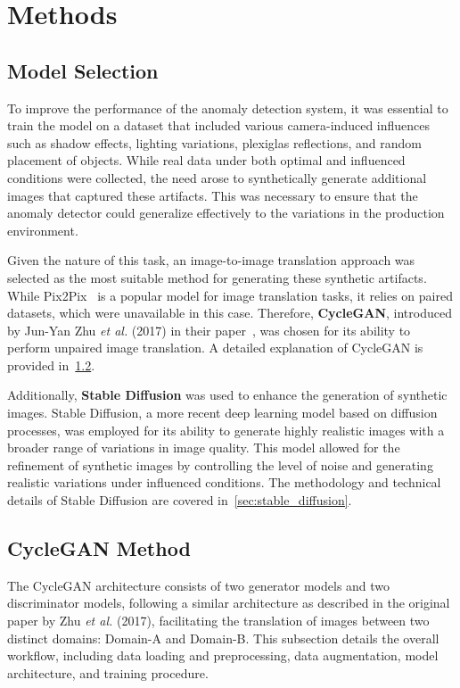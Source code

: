 \documentclass[12pt,DIV14,BCOR12mm,a4paper,footinclude=false,headinclude,parskip=half-,twoside,openright,cleardoublepage=empty,toc=index,bibliography=totoc,listof=totoc]{scrreprt}
\numberwithin{equation}{chapter}
\begin{document}
\section{Methods}
\subsection{Model Selection}
To improve the performance of the anomaly detection system, it was essential to train the model on a dataset that included various camera-induced influences such as shadow effects, lighting variations, plexiglas reflections, and random placement of objects. While real data under both optimal and influenced conditions were collected, the need arose to synthetically generate additional images that captured these artifacts. This was necessary to ensure that the anomaly detector could generalize effectively to the variations in the production environment.

Given the nature of this task, an image-to-image translation approach was selected as the most suitable method for generating these synthetic artifacts. While Pix2Pix~\cite{isola2017image} is a popular model for image translation tasks, it relies on paired datasets, which were unavailable in this case. Therefore, \textbf{CycleGAN}, introduced by Jun-Yan Zhu \textit{et al.} (2017) in their paper~\cite{zhu2017unpaired}, was chosen for its ability to perform unpaired image translation. A detailed explanation of CycleGAN is provided in~\ref{sec:cyclegan}.

Additionally, \textbf{Stable Diffusion} was used to enhance the generation of synthetic images. Stable Diffusion, a more recent deep learning model based on diffusion processes, was employed for its ability to generate highly realistic images with a broader range of variations in image quality. This model allowed for the refinement of synthetic images by controlling the level of noise and generating realistic variations under influenced conditions. The methodology and technical details of Stable Diffusion are covered in~\ref{sec:stable_diffusion}.
\subsection{CycleGAN Method}
\label{sec:cyclegan}


The CycleGAN architecture consists of two generator models and two discriminator models, following a similar architecture as described in the original paper by Zhu \textit{et al.} (2017), facilitating the translation of images between two distinct domains: Domain-A and Domain-B. This subsection details the overall workflow, including data loading and preprocessing, data augmentation, model architecture, and training procedure.
\end{document}
